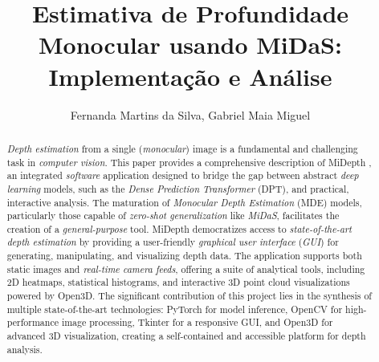 \documentclass{SBCbookchapter}
\author{Fernanda Martins da Silva, Gabriel Maia Miguel}
\title{Estimativa de Profundidade Monocular usando MiDaS: Implementação e Análise}
\newcommand{\nomeProjeto}{MiDepth }
\begin{document}
    \maketitle

    \begin{abstract}
        \textit{Depth estimation} from a single (\textit{monocular}) image is a fundamental
        and challenging task in \textit{computer vision}. This paper provides a comprehensive
        description of \nomeProjeto, an integrated \textit{software} application
        designed to bridge the gap between abstract \textit{deep learning} models,
        such as the \textit{Dense Prediction Transformer} (DPT), and practical,
        interactive analysis. The maturation of \textit{Monocular Depth Estimation}
        (MDE) models, particularly those capable of \textit{zero-shot generalization}
        like \textit{MiDaS}, facilitates the creation of a \textit{general-purpose}
        tool. \nomeProjeto democratizes access to \textit{state-of-the-art depth
        estimation} by providing a user-friendly \textit{graphical user interface}
        (\textit{GUI}) for generating, manipulating, and visualizing depth data.
        The application supports both static images and \textit{real-time camera
        feeds}, offering a suite of analytical tools, including 2D heatmaps, statistical
        histograms, and interactive 3D point cloud visualizations powered by Open3D.
        The significant contribution of this project lies in the synthesis of
        multiple state-of-the-art technologies: PyTorch for model inference,
        OpenCV for high-performance image processing, Tkinter for a responsive
        GUI, and Open3D for advanced 3D visualization, creating a self-contained
        and accessible platform for depth analysis.
    \end{abstract}
\end{document}
